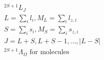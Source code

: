 \begin{align*}
&^{2S+1}L_J\\
&L=\sum_il_i, M_L=\sum_il_{z,i}\\
&S=\sum_is_i, M_S=\sum_is_{z,i}\\
&J=L+S, L+S-1, \ldots, |L-S|\\
&^{2S+1}\Lambda_\Omega \textrm{ for molecules}\\
\end{align*}